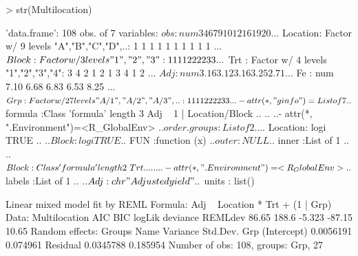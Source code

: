\documentclass[12pt]{article}
\begin{document}
\begin{Schunk}
\begin{Sinput}
> str(Multilocation)
\end{Sinput}
\begin{Soutput}
'data.frame':	108 obs. of  7 variables:
 $ obs     : num  3 4 6 7 9 10 12 16 19 20 ...
 $ Location: Factor w/ 9 levels "A","B","C","D",..: 1 1 1 1 1 1 1 1 1 1 ...
 $ Block   : Factor w/ 3 levels "1","2","3": 1 1 1 1 2 2 2 2 3 3 ...
 $ Trt     : Factor w/ 4 levels "1","2","3","4": 3 4 2 1 2 1 3 4 1 2 ...
 $ Adj     : num  3.16 3.12 3.16 3.25 2.71 ...
 $ Fe      : num  7.10 6.68 6.83 6.53 8.25 ...
 $ Grp     : Factor w/ 27 levels "A/1","A/2","A/3",..: 1 1 1 1 2 2 2 2 3 3 ...
 - attr(*, "ginfo")=List of 7
  ..$ formula     :Class 'formula' length 3 Adj ~ 1 | Location/Block
  .. .. ..- attr(*, ".Environment")=<R_GlobalEnv> 
  ..$ order.groups:List of 2
  .. ..$ Location: logi TRUE
  .. ..$ Block   : logi TRUE
  ..$ FUN         :function (x)  
  ..$ outer       : NULL
  ..$ inner       :List of 1
  .. ..$ Block:Class 'formula' length 2 ~Trt
  .. .. .. ..- attr(*, ".Environment")=<R_GlobalEnv> 
  ..$ labels      :List of 1
  .. ..$ Adj: chr "Adjusted yield"
  ..$ units       : list()
\end{Soutput}
\begin{Soutput}
Linear mixed model fit by REML 
Formula: Adj ~ Location * Trt + (1 | Grp) 
   Data: Multilocation 
   AIC   BIC logLik deviance REMLdev
 86.65 188.6 -5.323   -87.15   10.65
Random effects:
 Groups   Name        Variance  Std.Dev.
 Grp      (Intercept) 0.0056191 0.074961
 Residual             0.0345788 0.185954
Number of obs: 108, groups: Grp, 27


\end{Soutput}
\end{Schunk}
\end{document}
